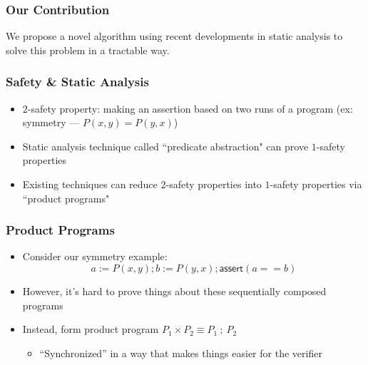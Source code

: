 \documentclass{beamer} %
\theoremstyle{definition} %
\begin{document}
\begin{frame}
    \frametitle{Our Contribution}
    
        We propose a novel algorithm using recent developments in static analysis to solve this problem in a tractable way.
        
    
    
    \end{frame}

\begin{frame}
\frametitle{Safety \& Static Analysis}

\begin{itemize}
    \item $2$-safety property: making an assertion based on two runs of a program (ex: symmetry --- $P(x,y) = P(y,x)$)
    \item Static analysis technique called ``predicate abstraction" can prove $1$-safety properties
    \item Existing techniques can reduce $2$-safety properties into $1$-safety properties via ``product programs"
\end{itemize}



\end{frame}

\begin{frame}
    \frametitle{Product Programs}
    
    \begin{itemize}
        \item Consider our symmetry example: \[a := P(x,y) ; b := P(y,x) ; \textsf{assert}(a ==b)\]
        \item However, it's hard to prove things about these sequentially composed programs

        \pause
        \item Instead, form product program $P_1 \times P_2 \equiv P_1\ ;\ P_2$ 

        \begin{itemize}
            \item ``Synchronized'' in a way that makes things easier for the verifier
        \end{itemize}
    \end{itemize}
    
    
    \end{frame}
\end{document}
